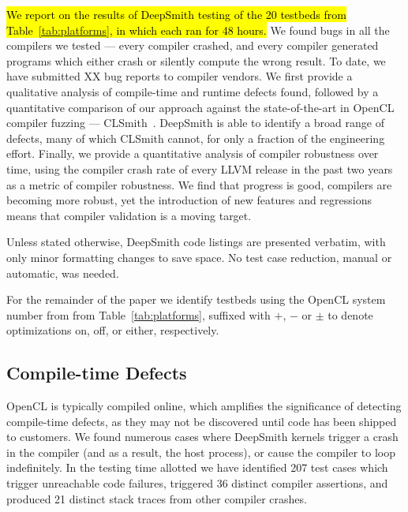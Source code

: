 \hl{We report on the results of DeepSmith testing of the 20 testbeds from Table~\ref{tab:platforms}, in which each ran for 48 hours.}
We found bugs in all the compilers we tested --- every compiler crashed, and every compiler generated programs which either crash or silently compute the wrong result. To date, we have submitted XX bug reports to compiler vendors. We first provide a qualitative analysis of compile-time and runtime defects found, followed by a quantitative comparison of our approach against the state-of-the-art in OpenCL compiler fuzzing --- CLSmith~\cite{Lidbury2015a}. DeepSmith is able to identify a broad range of defects, many of which CLSmith cannot, for only a fraction of the engineering effort. Finally, we provide a quantitative analysis of compiler robustness over time, using the compiler crash rate of every LLVM release in the past two years as a metric of compiler robustness. We find that progress is good, compilers are becoming more robust, yet the introduction of new features and regressions means that compiler validation is a moving target.


Unless stated otherwise, DeepSmith code listings are presented verbatim, with only minor formatting changes to save space. No test case reduction, manual or automatic, was needed.


For the remainder of the paper we identify testbeds using the OpenCL system number from from Table~\ref{tab:platforms}, suffixed with $+$, $-$ or $\pm$ to denote optimizations on, off, or either, respectively.

\subsection{Compile-time Defects}%
\label{subsec:compile-time-defects}

OpenCL is typically compiled online, which amplifies the significance of detecting compile-time defects, as they may not be discovered until code has been shipped to customers. We found numerous cases where DeepSmith kernels trigger a crash in the compiler (and as a result, the host process), or cause the compiler to loop indefinitely. In the testing time allotted we have identified 207 test cases which trigger unreachable code failures, triggered 36 distinct compiler assertions, and produced 21 distinct stack traces from other compiler crashes.

